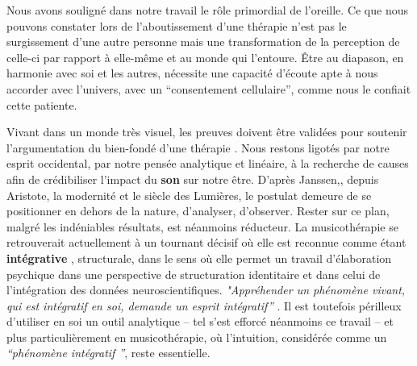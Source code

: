 
Nous avons souligné dans notre travail le rôle primordial de
l'oreille. %
Ce que nous pouvons constater lors de l'aboutissement
d'une thérapie n'est pas le surgissement d'une autre personne mais une transformation
de la perception de celle-ci par rapport à elle-même et au monde qui l'entoure.
Être au diapason, en harmonie avec soi et les autres, nécessite une capacité d'écoute apte à nous 
accorder avec l'univers, avec un \enquote {consentement cellulaire}, comme nous le 
confiait cette patiente.

Vivant dans un monde très visuel, les preuves doivent être
validées pour soutenir l'argumentation du bien-fondé d'une thérapie
\autocite{vrait_musicotherapie_2018}.
Nous restons
  ligotés par notre esprit occidental, par
  notre pensée analytique et linéaire, à la recherche de
  causes afin de crédibiliser l'impact
  du \textbf{son} sur notre être.
  D'après Janssen,\autocite{van_eersel_cerveau}, depuis Aristote, la modernité et le
siècle des Lumières, le postulat demeure de se positionner en dehors
de la nature, d'analyser, d'observer.
Rester sur ce plan, malgré les
indéniables résultats, est néanmoins
réducteur.
La musicothérapie  se retrouverait actuellement
 à un tournant décisif où elle est reconnue comme étant \textbf{intégrative} 
 \autocite{vrait_musicotherapie_2018},
struc\-tu\-rale, dans le sens où elle permet un travail d'élaboration psychique dans une perspective de structuration identitaire  et dans celui de l'intégration des données neuroscientifiques.
\textit{"Appréhender un phénomène vivant, qui est intégratif en soi, demande un esprit
  intégratif''} \autocite[201]{van_eersel_cerveau}.
Il est toutefois périlleux d'utiliser en soi un outil analytique -- tel s'est efforcé néanmoins ce travail -- et
plus
particulièrement en musicothérapie, où l'intuition, 
considérée comme un \textit{``phénomène intégratif ''}, reste essentielle.

